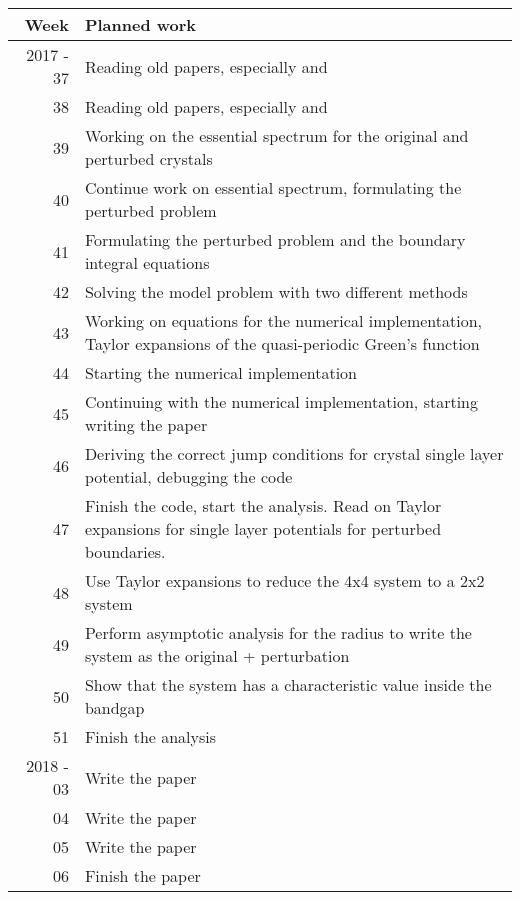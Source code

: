 \documentclass[a4paper]{article}
\theoremstyle{definition}
\begin{document}
\begin{table}[h]
	\centering
\begin{tabular}{r|p{13cm}}
	Week & Planned work \\ \hline
	2017 - 37 & Reading old papers, especially \cite{first} and \cite{bandgap}\\
	38 & Reading old papers, especially \cite{first} and \cite{bandgap}\\
	39 & Working on the essential spectrum for the original and perturbed crystals\\
	40 & Continue work on essential spectrum, formulating the perturbed problem\\
	41 & Formulating the perturbed problem and the boundary integral equations \\
	42 & Solving the model problem with two different methods \\
	43 & Working on equations for the numerical implementation, Taylor expansions of the quasi-periodic Green's function\\
	44 & Starting the numerical implementation\\
	45 & Continuing with the numerical implementation, starting writing the paper\\
	46 & Deriving the correct jump conditions for crystal single layer potential, debugging the code\\
	47 & Finish the code, start the analysis. Read on Taylor expansions for single layer potentials for perturbed boundaries.\\
	48 & Use Taylor expansions to reduce the 4x4 system to a 2x2 system\\
	49 & Perform asymptotic analysis for the radius to write the system as the original + perturbation\\
	50 & Show that the system has a characteristic value inside the bandgap\\
	51 & Finish the analysis\\
	2018 - 03 & Write the paper\\
	04 & Write the paper\\
	05 & Write the paper\\
	06 & Finish the paper\\
	
\end{tabular}
\end{table}
{}

\end{document}
